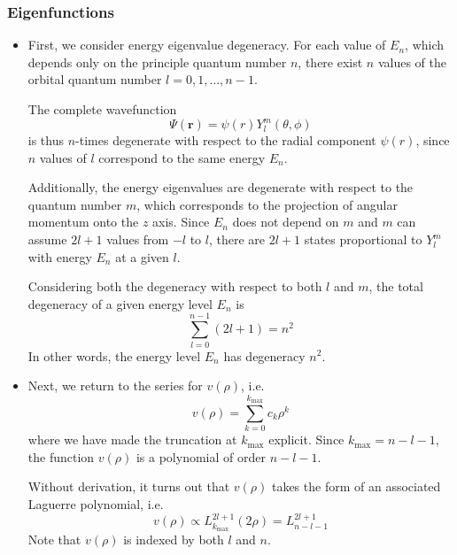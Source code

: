 \documentclass[11pt, a4paper]{article}
\renewcommand{\vec}[1]{\bm{#1}}  %
\renewcommand{\r}{\vec{r}}  %
\newcommand{\p}{\psi}  %
\renewcommand{\P}{\Psi}  %
\begin{document}
\subsubsection{Eigenfunctions}
\begin{itemize}
	\item First, we consider energy eigenvalue degeneracy. For each value of $ E_{n} $, which depends only on the principle quantum number $ n $, there exist $ n $ values of the orbital quantum number $ l = 0, 1, \ldots, n-1 $. 
	
	The complete wavefunction 
	\begin{equation*}
		\P(\r) = \p(r)Y_{l}^{m}(\theta, \phi) 
	\end{equation*}
	is thus $ n $-times degenerate with respect to the radial component $ \p(r) $, since $ n $ values of $ l $ correspond to the same energy $ E_{n} $. 
	
	Additionally, the energy eigenvalues are degenerate with respect to the quantum number $ m $, which corresponds to the projection of angular momentum onto the $ z $ axis. Since $ E_{n} $ does not depend on $ m $ and $ m $ can assume $ 2l + 1 $ values from $ -l $ to $ l $, there are $ 2l + 1 $ states proportional to $ Y_{l}^{m} $ with energy $ E_{n} $ at a given $ l $.  
	
	Considering both the degeneracy with respect to both $ l $ and $ m $, the total degeneracy of a given energy level $ E_{n} $ is
	\begin{equation*}
		\sum_{l = 0}^{n-1}(2l+1) = n^{2}
	\end{equation*}
	In other words, the energy level $ E_{n} $ has degeneracy $ n^{2} $. 
	
	\item Next, we return to the series for $ v(\rho) $, i.e.
	\begin{equation*}
		v(\rho) = \sum_{k = 0}^{k_{\text{max}}} c_{k}\rho^{k}
	\end{equation*}
	where we have made the truncation at $ k_{\text{max}} $ explicit. Since $ k_{\text{max}} = n - l - 1 $, the function $ v(\rho) $ is a polynomial of order $ n - l - 1 $. 
	
	Without derivation, it turns out that $ v(\rho) $ takes the form of an associated Laguerre polynomial, i.e.
	\begin{equation*}
		v(\rho) \propto L_{k_{\text{max}}}^{2l+1}(2\rho) = L_{n - l - 1}^{2l + 1}
	\end{equation*}
	Note that $ v(\rho) $ is indexed by both $ l $ and $ n $.
	

\end{itemize}
\end{document}
